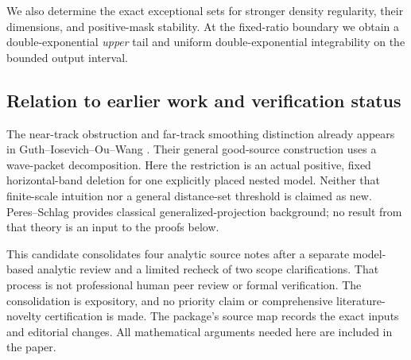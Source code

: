 We also determine the exact exceptional sets for stronger density
regularity, their dimensions, and positive-mask stability. At the
fixed-ratio boundary we obtain a double-exponential \emph{upper} tail and
uniform double-exponential integrability on the bounded output interval.

\subsection{Relation to earlier work and verification status}
The near-track obstruction and far-track smoothing distinction already
appears in Guth--Iosevich--Ou--Wang \cite[Sections~1.2 and~6]{GIOW}.
Their general good-source construction uses a wave-packet decomposition.
Here the restriction is an actual positive, fixed horizontal-band deletion
for one explicitly placed nested model. Neither that finite-scale intuition
nor a general distance-set threshold is claimed as new. Peres--Schlag
\cite{PS} provides classical generalized-projection background; no result
from that theory is an input to the proofs below.

This candidate consolidates four analytic source notes after a separate
model-based analytic review and a limited recheck of two scope
clarifications. That process is not professional human peer review or
formal verification. The consolidation is expository, and no priority claim
or comprehensive literature-novelty certification is made. The package's
source map records the exact inputs and editorial changes. All mathematical
arguments needed here are included in the paper.
